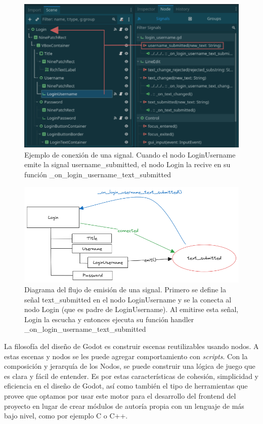 \begin{figure}[htbp]
    \centering
    \includegraphics[width=1.0\textwidth]{../assets/godot-signals.png}
    \caption{Ejemplo de conexión de una signal. Cuando el nodo LoginUsername emite la signal
            username\_submitted, el nodo Login la recive en su función \_on\_login\_username\_text\_submitted}
    \label{fig:signals-editor}
\end{figure}

\begin{figure}[htbp]
    \centering
    \includegraphics[width=1.0\textwidth]{../assets/godot-signals-diagram.png}
    \caption{Diagrama del flujo de emisión de una signal. Primero se define la señal text\_submitted
            en el nodo LoginUsername y se la conecta al nodo Login (que es padre de LoginUsername).
            Al emitirse esta señal, Login la escucha y entonces ejecuta su función handler
            \_on\_login\_username\_text\_submitted}
    \label{fig:signals-diagram}
\end{figure}

La filosofía del diseño de Godot es construir escenas reutilizables usando nodos. A estas escenas y 
nodos se les puede agregar comportamiento con \textit{scripts}. Con la composición y jerarquía de los Nodos, 
se puede construir una lógica de juego que es clara y fácil de entender.
Es por estas características de cohesión, simplicidad y eficiencia en el diseño de Godot, así
como también el tipo de herramientas que provee que optamos por usar este motor para el desarrollo del
frontend del proyecto en lugar de crear módulos de autoría propia con un lenguaje de más bajo nivel, 
como por ejemplo C o C++.

